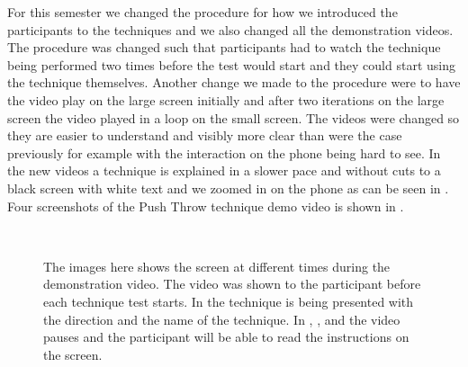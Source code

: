 For this semester we changed the procedure for how we introduced the participants to the techniques and we also changed all the demonstration videos.
The procedure was changed such that participants had to watch the technique being performed two times before the test would start and they could start using the technique themselves.
Another change we made to the procedure were to have the video play on the large screen initially and after two iterations on the large screen the video played in a loop on the small screen.
The videos were changed so they are easier to understand and visibly more clear than were the case previously for example with the interaction on the phone being hard to see.
In the new videos a technique is explained in a slower pace and without cuts to a black screen with white text and we zoomed in on the phone as can be seen in .
Four screenshots of the Push Throw technique demo video is shown in .

\begin{figure}[H]
\\
\caption{The images here shows the screen at different times during the demonstration video. The video was shown to the participant before each technique test starts. In \protect{} the technique is being presented with the direction and the name of the technique. In \protect{}, \protect{}, and \protect{} the video pauses and the participant will be able to read the instructions on the screen.}
\label{fig:demovideo}
\end{figure}